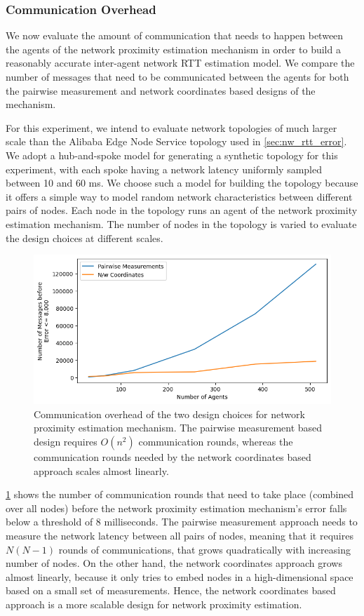 \subsubsection{Communication Overhead}
We now evaluate the amount of communication that needs to happen between the agents of the network proximity estimation mechanism in order to build a reasonably accurate inter-agent network RTT estimation model. We compare the number of messages that need to be communicated between the agents for both the pairwise measurement and network coordinates based designs of the mechanism. 
\par For this experiment, we intend to evaluate network topologies of much larger scale than the Alibaba Edge Node Service topology used in \cref{sec:nw_rtt_error}. We adopt a hub-and-spoke model for generating a synthetic topology for this experiment, with each spoke having a network latency uniformly sampled between 10 and 60 ms. We choose such a model for building the topology because it offers a simple way to model random network characteristics between different pairs of nodes. Each node in the topology runs an agent of the network proximity estimation mechanism. The number of nodes in the topology is varied to evaluate the design choices at different scales.
\begin{figure}
\centering
\includegraphics[width=0.75\linewidth]{figures/design_space/nw_prox/comm_overhead.png}
\caption{Communication overhead of the two design choices for network proximity estimation mechanism. The pairwise measurement based design requires $O \left( n^2 \right)$ communication rounds, whereas the communication rounds needed by the network coordinates based approach scales almost linearly.}
\label{fig:comm_overhead}
\end{figure}

\par \cref{fig:comm_overhead} shows the number of communication rounds that need to take place (combined over all nodes) before the network proximity estimation mechanism's error falls below a threshold of 8 milliseconds. The pairwise measurement approach needs to measure the network latency between all pairs of nodes, meaning that it requires $N \left( N - 1 \right)$ rounds of communications, that grows quadratically with increasing number of nodes. On the other hand, the network coordinates approach grows almost linearly, because it only tries to embed nodes in a high-dimensional space based on a small set of measurements. Hence, the network coordinates based approach is a more scalable design for network proximity estimation.

